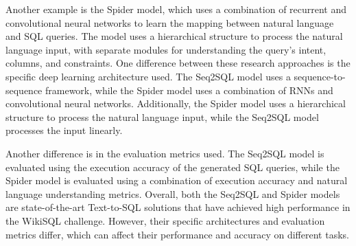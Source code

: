 Another example is the Spider model, which uses a combination of recurrent and convolutional neural networks to learn the mapping between natural language and SQL queries. The model uses a hierarchical structure to process the natural language input, with separate modules for understanding the query's intent, columns, and constraints.
One difference between these research approaches is the specific deep learning architecture used. The Seq2SQL model uses a sequence-to-sequence framework, while the Spider model uses a combination of RNNs and convolutional neural networks. Additionally, the Spider model uses a hierarchical structure to process the natural language input, while the Seq2SQL model processes the input linearly.

Another difference is in the evaluation metrics used. The Seq2SQL model is evaluated using the execution accuracy of the generated SQL queries, while the Spider model is evaluated using a combination of execution accuracy and natural language understanding metrics.
Overall, both the Seq2SQL and Spider models are state-of-the-art Text-to-SQL solutions that have achieved high performance in the WikiSQL challenge. However, their specific architectures and evaluation metrics differ, which can affect their performance and accuracy on different tasks.
